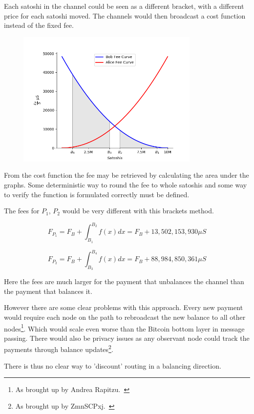 Each satoshi in the channel could be seen as a different bracket, with a different price for each satoshi moved. The channels would then broadcast a cost function instead of the fixed fee.

\begin{figure}[!htb]
	\hspace*{-0.5cm}
	\centering
	\includegraphics[width=9cm]{images/fee_scheme.png}
	\label{fig:xt_nodes}
	\hspace{2mm}
\end{figure}

From the cost function the fee may be retrieved by calculating the area under the graphs. Some deterministic way to round the fee to whole satoshis and some way to verify the function is formulated correctly must be defined. 

The fees for $P_1$, $P_2$ would be very different with this brackets method.

\[ F_{P_1} = F_{B} + \int_{B_1}^{B_2} f(x) dx = F_B + 13,502,153,930 \mu S \] 

\[ F_{P_2} = F_{B} + \int_{B_3}^{B_4} f(x) dx  = F_B + 88,984,850,361 \mu S \]

Here the fees are much larger for the payment that unbalances the channel than the payment that balances it. 

However there are some clear problems with this approach. Every new payment would require each node on the path to rebroadcast the new balance to all other nodes\footnote{As brought up by Andrea Rapitzu.~\cite{raspitzu:fee}}. Which would scale even worse than the Bitcoin bottom layer in message passing. There would also be privacy issues as any observant node could track the payments through balance updates\footnote{As brought up by ZmnSCPxj.~\cite{ZmnSCPxj:fee}}.

There is thus no clear way to 'discount' routing in a balancing direction.


